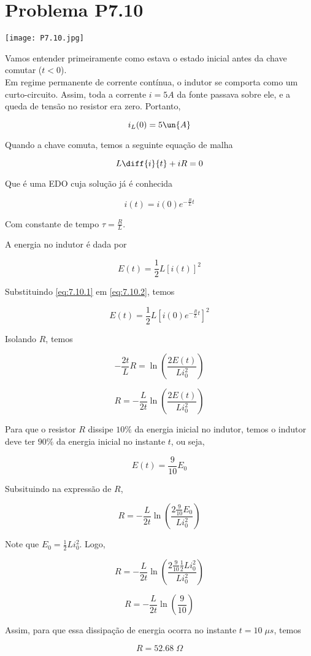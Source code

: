 
\section*{Problema P7.10}

\renewcommand*\thesection{7.10}

\begin{center}
    \texttt{[image: P7.10.jpg]}
\end{center}


Vamos entender primeiramente como estava o estado inicial antes da chave comutar ($t < 0$). \\
Em regime permanente de corrente contínua, o indutor se comporta como um curto-circuito. Assim,
toda a corrente $i = 5A$ da fonte passava sobre ele, e a queda de tensão no resistor era zero. Portanto,

\[ i_L(0) = 5 \un{A} \]

Quando a chave comuta, temos a seguinte equação de malha

\[ L\diff{i}{t} + iR = 0 \]

Que é uma EDO cuja solução já é conhecida 

\begin{equation}\label{eq:7.10.1}
    i(t) = i(0)e^{-\frac{R}{L}t}
\end{equation}

Com constante de tempo $\tau = \frac{R}{L}$.

A energia no indutor é dada por 

\begin{equation}\label{eq:7.10.2}
    E(t) = \frac{1}{2}L[i(t)]^2
\end{equation}

Substituindo \eqref{eq:7.10.1} em \eqref{eq:7.10.2}, temos

\[ E(t) = \frac{1}{2}L[i(0)e^{-\frac{R}{L}t}]^2 \]

Isolando $R$, temos 
 
\[ -\frac{2t}{L}R = \ln\left(\frac{2E(t)}{Li_0^2}\right) \]

\[ R = -\frac{L}{2t} \ln\left(\frac{2E(t)}{Li_0^2}\right) \]

Para que o resistor $R$ dissipe $10\%$ da energia inicial no indutor, temos o indutor deve ter $90\%$ da energia inicial no instante
$t$, ou seja, 

\[ E(t) = \frac{9}{10}E_0  \]

Subsituindo na expressão de $R$,

\[ R = -\frac{L}{2t} \ln\left(\frac{2\frac{9}{10}E_0}{Li_0^2}\right) \]

Note que $E_0 = \frac{1}{2}Li_0^2$. Logo,

\[ R = -\frac{L}{2t} \ln\left(\frac{2\frac{9}{10}\frac{1}{2}Li_0^2}{Li_0^2}\right) \]

\[ R = -\frac{L}{2t} \ln\left(\frac{9}{10}\right) \]

Assim, para que essa dissipação de energia ocorra no instante $t = 10\;\mu s$, temos 

\[ \boxed{R = 52.68 \;\Omega}  \]



